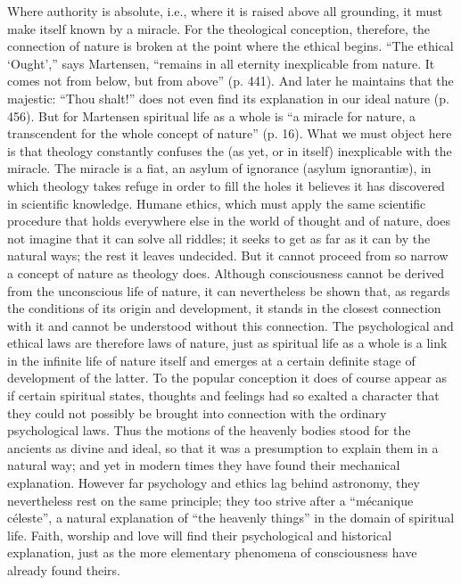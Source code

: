 \documentclass[12pt,a4paper,openany]{book}
\newcommand{\opage}[1]{\marginnote{\footnotesize\textit{[#1]}}}
\begin{document}
Where authority is absolute, i.e., where it is raised above all grounding, it
must make itself known by a miracle. For the theological conception,
therefore, the connection of nature is broken at the point where the ethical
begins. ``The ethical `Ought','' says Martensen, ``remains in all eternity
inexplicable from nature. It comes not from below, but from above'' (p. 441).
And later he maintains that the majestic: ``Thou shalt!'' does not even find
its explanation in our ideal nature (p. 456). But for Martensen spiritual life
as a whole is ``a miracle for nature, a transcendent for the whole concept of
nature'' (p. 16). What we must object here is that theology constantly
confuses the (as yet, or in itself) inexplicable with the miracle. The miracle
is a fiat, an asylum of ignorance (asylum ignorantiæ), in which theology takes
refuge in order to fill the holes it believes it has discovered in scientific
knowledge. Humane ethics, which must apply the same scientific procedure that
holds everywhere else in the world of thought and of nature, does not
\opage{74}imagine that it can solve all riddles; it seeks to get as far as it
can by the natural ways; the rest it leaves undecided. But it cannot proceed
from so narrow a concept of nature as theology does. Although consciousness
cannot be derived from the unconscious life of nature, it can nevertheless be
shown that, as regards the conditions of its origin and development, it stands
in the closest connection with it and cannot be understood without this
connection. The psychological and ethical laws are therefore laws of nature,
just as spiritual life as a whole is a link in the infinite life of nature
itself and emerges at a certain definite stage of development of the latter.
To the popular conception it does of course appear as if certain spiritual
states, thoughts and feelings had so exalted a character that they could not
possibly be brought into connection with the ordinary psychological laws. Thus
the motions of the heavenly bodies stood for the ancients as divine and ideal,
so that it was a presumption to explain them in a natural way; and yet in
modern times they have found their mechanical explanation. However far
psychology and ethics lag behind astronomy, they nevertheless rest on the same
principle; they too strive after a ``mécanique céleste'', a natural
explanation of ``the heavenly things'' in the domain of spiritual life. Faith,
worship and love will find their psychological and historical explanation,
just as the more elementary phenomena of consciousness have already found
theirs.
\end{document}
